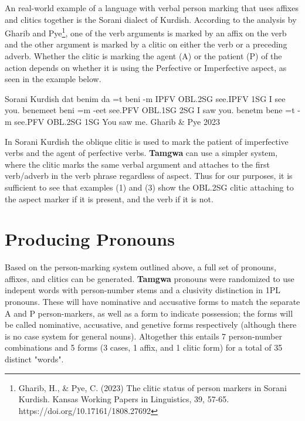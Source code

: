 \documentclass[a4paper,12pt,twoside,openright]{memoir}
\begin{document}
    An real-world example of a language with verbal person marking that uses affixes and clitics together is the Sorani dialect of Kurdish.  According to the analysis by Gharib and Pye\footnote{Gharib, H., \& Pye, C. (2023) The clitic status of person markers in Sorani Kurdish. Kansas Working Papers in Linguistics, 39, 57-65. https://doi.org/10.17161/1808.27692}, one of the verb arguments is marked by an affix on the verb and the other argument is marked by a clitic on either the verb or a preceding adverb.  Whether the clitic is marking the agent (A) or the patient (P) of the action depends on whether it is using the Perfective or Imperfective aspect, as seen in the example below.

\begin{examples}
    \ex
    \lect Sorani Kurdish
    \words {} dat  benim
    \bits da =t beni -m
    \gloss IPFV OBL.2SG see.IPFV 1SG
    \tr I see you.
    \ex
    \words {} benemeet
    \bits beni =m -eet
    \gloss see.PFV OBL.1SG 2SG
    \tr I saw you.
    \ex
    \words {} benetm
    \bits bene =t -m
    \gloss see.PFV OBL.2SG 1SG
    \tr You saw me.
    \source Gharib \& Pye 2023
\end{examples}

    In Sorani Kurdish the oblique clitic is used to mark the patient of imperfective verbs and the agent of perfective verbs.  \textbf{Tamgwa} can use a simpler system, where the clitic marks the same verbal argument and attaches to the first verb/adverb in the verb phrase regardless of aspect.  Thus for our purposes, it is sufficient to see that examples (1) and (3) show the OBL.2SG clitic attaching to the aspect marker if it is present, and the verb if it is not.

\section*{Producing Pronouns}

    Based on the person-marking system outlined above, a full set of pronouns, affixes, and clitics can be generated.  \textbf{Tamgwa} pronouns were randomized to use indepent words with person-number stems and a clusivity distinction in 1PL pronouns.  These will have nominative and accusative forms to match the separate A and P person-markers, as well as a form to indicate possession; the forms will be called nominative, accusative, and genetive forms respectively (although there is no case system for general nouns).  Altogether this entails 7 person-number combinations and 5 forms (3 cases, 1 affix, and 1 clitic form) for a total of 35 distinct "words".
\end{document}

